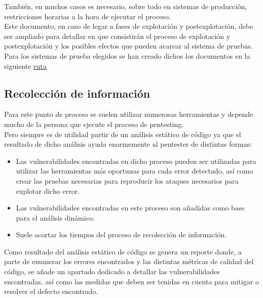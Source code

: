También, en muchos casos es necesario, sobre todo en sistemas de producción, restricciones horarias a la hora de ejecutar el proceso.\\

Este documento, en caso de legar a fases de explotación y postexplotación, debe ser ampliado para detallar en que consistirán el 
proceso de explotación y postexplotación y los posibles efectos que pueden acarear al sistema de pruebas.\\

Para los sistemas de prueba elegidos se han creado dichos los documentos en la siguiente 
\href{https://github.com/M0l1n3ta/PFG/tree/master/Reportes/PPR%20-%20Plan%20de%20pruebas}{ruta} \cite{web3}\\

\subsection{Recolección de información}

Para este punto de proceso se suelen utilizar numerosas herramientas y depende mucho de la persona que ejecute 
el proceso de pentesting.\\ 

Pero siempre es de utilidad partir de un análisis estático de código ya que el resultado de dicho 
análisis ayuda enormemente al pentester de distintas formas:

\begin{itemize}
    \item Las vulnerabilidades encontradas en dicho proceso pueden ser utilizadas para utilizar las herramientas más 
    oportunas para cada error detectado, así como crear las pruebas necesarias para reproducir los ataques necesarios 
    para explotar dicho error.
    \item Las vulnerabilidades encontradas en este proceso son añadidas como base para el análisis dinámico.
    \item Suele acortar los tiempos del proceso de recolección de información.
\end{itemize}

Como resultado del análisis estático de código se genera un reporte donde, a parte de enumerar los errores
encontrados y las distintas métricas de calidad del código, se añade un apartado dedicado a detallar las 
vulnerabilidades encontradas, así como las medidas que deben ser tenidas en cuenta para mitigar o resolver el defecto encontrado.\\


